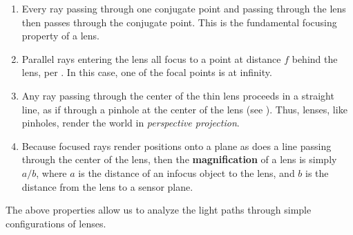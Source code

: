 \begin{enumerate}
\item Every ray passing through one conjugate point and passing through the lens then passes through the conjugate point.  This is the fundamental focusing property of a lens.
\item Parallel rays entering the lens all focus to a point at distance $f$ behind the lens, per \eqn{\ref{eq:lensmaker}}.  In this case, one of the focal points is at infinity.
\item Any ray passing  through the center of the thin lens proceeds in a straight line, as if through a pinhole at the center of the lens (see \fig{\ref{fig:thinLens}}).  Thus, lenses, like pinholes, render the world in {\em perspective projection}.
\item Because focused rays render positions onto a plane as does a line passing through the center of the lens, then the {\bf magnification} of a lens is simply $a/b$, where $a$ is the distance of an infocus object to the lens, and $b$ is the distance from the lens to a sensor plane.
\end{enumerate}
The above properties allow us to analyze the light paths through simple configurations of lenses.

